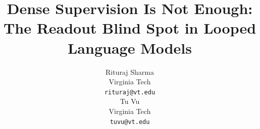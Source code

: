 \usepackage[preprint]{neurips_2026}

\usepackage[utf8]{inputenc}
\usepackage[T1]{fontenc}
\usepackage{hyperref}
\usepackage{url}
\usepackage{booktabs}
\usepackage{amsmath}
\usepackage{amsfonts}
\usepackage{amssymb}
\usepackage{amsthm}
\usepackage{nicefrac}
\usepackage{microtype}
\usepackage{xcolor}
\usepackage{graphicx}
\usepackage{subcaption}
\usepackage{multirow}
\usepackage{placeins}

\hypersetup{hidelinks}
\renewcommand{\ttdefault}{lmtt}

\theoremstyle{definition}
\newtheorem{lemma}{Lemma}

\newcommand{\rms}{\mathrm{rms}}
\newcommand{\rad}{\mathrm{rad}}

\title{Dense Supervision Is Not Enough: The Readout Blind Spot in Looped Language Models}

\author{%
  Rituraj Sharma \\
  Virginia Tech \\
  \texttt{rituraj@vt.edu} \\
  \And
  Tu Vu \\
  Virginia Tech \\
  \texttt{tuvu@vt.edu} \\
}
